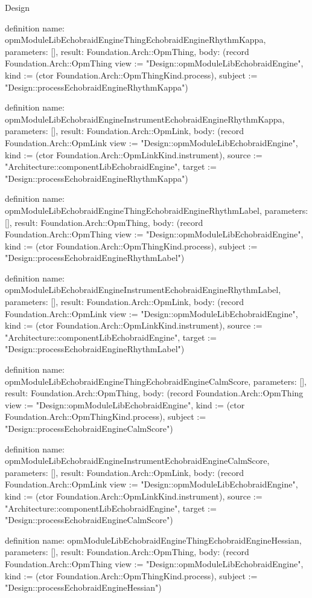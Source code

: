 \begin{lexlean}{Design}
\begin{semanticmodule}
definition{
  name: opmModuleLibEchobraidEngineThingEchobraidEngineRhythmKappa,
  parameters: [],
  result: Foundation.Arch::OpmThing,
  body: (record Foundation.Arch::OpmThing {view := "Design::opmModuleLibEchobraidEngine", kind := (ctor Foundation.Arch::OpmThingKind.process), subject := "Design::processEchobraidEngineRhythmKappa"})
}

definition{
  name: opmModuleLibEchobraidEngineInstrumentEchobraidEngineRhythmKappa,
  parameters: [],
  result: Foundation.Arch::OpmLink,
  body: (record Foundation.Arch::OpmLink {view := "Design::opmModuleLibEchobraidEngine", kind := (ctor Foundation.Arch::OpmLinkKind.instrument), source := "Architecture::componentLibEchobraidEngine", target := "Design::processEchobraidEngineRhythmKappa"})
}

definition{
  name: opmModuleLibEchobraidEngineThingEchobraidEngineRhythmLabel,
  parameters: [],
  result: Foundation.Arch::OpmThing,
  body: (record Foundation.Arch::OpmThing {view := "Design::opmModuleLibEchobraidEngine", kind := (ctor Foundation.Arch::OpmThingKind.process), subject := "Design::processEchobraidEngineRhythmLabel"})
}

definition{
  name: opmModuleLibEchobraidEngineInstrumentEchobraidEngineRhythmLabel,
  parameters: [],
  result: Foundation.Arch::OpmLink,
  body: (record Foundation.Arch::OpmLink {view := "Design::opmModuleLibEchobraidEngine", kind := (ctor Foundation.Arch::OpmLinkKind.instrument), source := "Architecture::componentLibEchobraidEngine", target := "Design::processEchobraidEngineRhythmLabel"})
}

definition{
  name: opmModuleLibEchobraidEngineThingEchobraidEngineCalmScore,
  parameters: [],
  result: Foundation.Arch::OpmThing,
  body: (record Foundation.Arch::OpmThing {view := "Design::opmModuleLibEchobraidEngine", kind := (ctor Foundation.Arch::OpmThingKind.process), subject := "Design::processEchobraidEngineCalmScore"})
}

definition{
  name: opmModuleLibEchobraidEngineInstrumentEchobraidEngineCalmScore,
  parameters: [],
  result: Foundation.Arch::OpmLink,
  body: (record Foundation.Arch::OpmLink {view := "Design::opmModuleLibEchobraidEngine", kind := (ctor Foundation.Arch::OpmLinkKind.instrument), source := "Architecture::componentLibEchobraidEngine", target := "Design::processEchobraidEngineCalmScore"})
}

definition{
  name: opmModuleLibEchobraidEngineThingEchobraidEngineHessian,
  parameters: [],
  result: Foundation.Arch::OpmThing,
  body: (record Foundation.Arch::OpmThing {view := "Design::opmModuleLibEchobraidEngine", kind := (ctor Foundation.Arch::OpmThingKind.process), subject := "Design::processEchobraidEngineHessian"})
}


\end{semanticmodule}
\end{lexlean}
